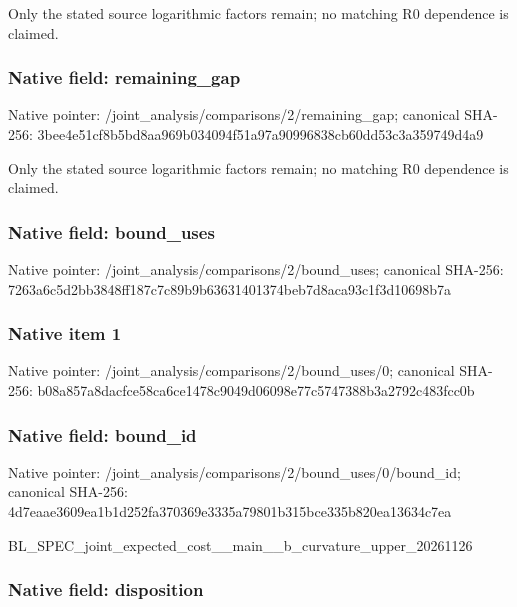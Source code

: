 \documentclass[10pt,a4paper]{article}
\begin{document}
Only the stated source logarithmic factors remain; no matching R0 dependence is claimed.


\subsubsection{Native field: remaining\_gap}


Native pointer: /joint\_analysis/comparis\allowbreak{}ons/2/remaining\_gap; canonical SHA-256: 3bee4e51cf8b5bd8aa969b03\allowbreak{}4094f51a97a90996838cb60d\allowbreak{}d53c3a359749d4a9


Only the stated source logarithmic factors remain; no matching R0 dependence is claimed.


\subsubsection{Native field: bound\_uses}


Native pointer: /joint\_analysis/comparis\allowbreak{}ons/2/bound\_uses; canonical SHA-256: 7263a6c5d2bb3848ff187c7c\allowbreak{}89b9b63631401374beb7d8ac\allowbreak{}a93c1f3d10698b7a



\subsubsection{Native item 1}


Native pointer: /joint\_analysis/comparis\allowbreak{}ons/2/bound\_uses/0; canonical SHA-256: b08a857a8dacfce58ca6ce14\allowbreak{}78c9049d06098e77c5747388\allowbreak{}b3a2792c483fcc0b



\subsubsection{Native field: bound\_id}


Native pointer: /joint\_analysis/comparis\allowbreak{}ons/2/bound\_uses/0/bound\allowbreak{}\_id; canonical SHA-256: 4d7eaae3609ea1b1d252fa37\allowbreak{}0369e3335a79801b315bce33\allowbreak{}5b820ea13634c7ea


BL\_SPEC\_joint\_expected\_c\allowbreak{}ost\_\_main\_\_b\_curvature\_u\allowbreak{}pper\_20261126


\subsubsection{Native field: disposition}
\end{document}
